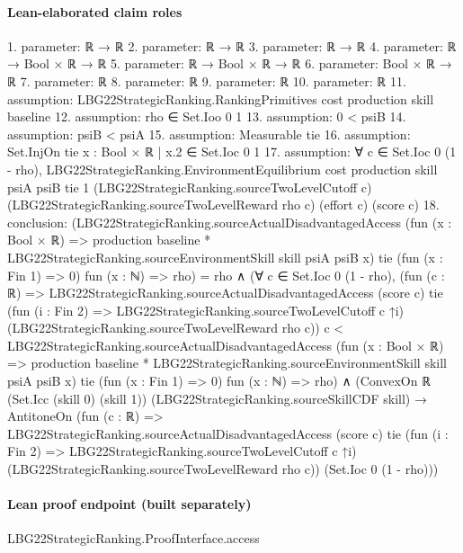 \documentclass[10pt]{article}
\begin{document}
\paragraph{Lean-elaborated claim roles}\begin{ReviewVerbatim}
1. parameter: ℝ → ℝ
2. parameter: ℝ → ℝ
3. parameter: ℝ → ℝ
4. parameter: ℝ → Bool × ℝ → ℝ
5. parameter: ℝ → Bool × ℝ → ℝ
6. parameter: Bool × ℝ → ℝ
7. parameter: ℝ
8. parameter: ℝ
9. parameter: ℝ
10. parameter: ℝ
11. assumption: LBG22StrategicRanking.RankingPrimitives cost production skill baseline
12. assumption: rho ∈ Set.Ioo 0 1
13. assumption: 0 < psiB
14. assumption: psiB < psiA
15. assumption: Measurable tie
16. assumption: Set.InjOn tie {x : Bool × ℝ | x.2 ∈ Set.Ioc 0 1}
17. assumption: ∀ c ∈ Set.Ioc 0 (1 - rho),
  LBG22StrategicRanking.EnvironmentEquilibrium cost production skill psiA psiB tie 1
    (LBG22StrategicRanking.sourceTwoLevelCutoff c) (LBG22StrategicRanking.sourceTwoLevelReward rho c) (effort c)
    (score c)
18. conclusion: (LBG22StrategicRanking.sourceActualDisadvantagedAccess
      (fun (x : Bool × ℝ) => production baseline * LBG22StrategicRanking.sourceEnvironmentSkill skill psiA psiB x) tie
      (fun (x : Fin 1) => 0) fun (x : ℕ) => rho) =
    rho ∧
  (∀ c ∈ Set.Ioc 0 (1 - rho),
      (fun (c : ℝ) =>
            LBG22StrategicRanking.sourceActualDisadvantagedAccess (score c) tie
              (fun (i : Fin 2) => LBG22StrategicRanking.sourceTwoLevelCutoff c ↑i)
              (LBG22StrategicRanking.sourceTwoLevelReward rho c))
          c <
        LBG22StrategicRanking.sourceActualDisadvantagedAccess
          (fun (x : Bool × ℝ) => production baseline * LBG22StrategicRanking.sourceEnvironmentSkill skill psiA psiB x)
          tie (fun (x : Fin 1) => 0) fun (x : ℕ) => rho) ∧
    (ConvexOn ℝ (Set.Icc (skill 0) (skill 1)) (LBG22StrategicRanking.sourceSkillCDF skill) →
      AntitoneOn
        (fun (c : ℝ) =>
          LBG22StrategicRanking.sourceActualDisadvantagedAccess (score c) tie
            (fun (i : Fin 2) => LBG22StrategicRanking.sourceTwoLevelCutoff c ↑i)
            (LBG22StrategicRanking.sourceTwoLevelReward rho c))
        (Set.Ioc 0 (1 - rho)))
\end{ReviewVerbatim}

\paragraph{Lean proof endpoint (built separately)}\begin{ReviewVerbatim}
LBG22StrategicRanking.ProofInterface.access
\end{ReviewVerbatim}
\end{document}
